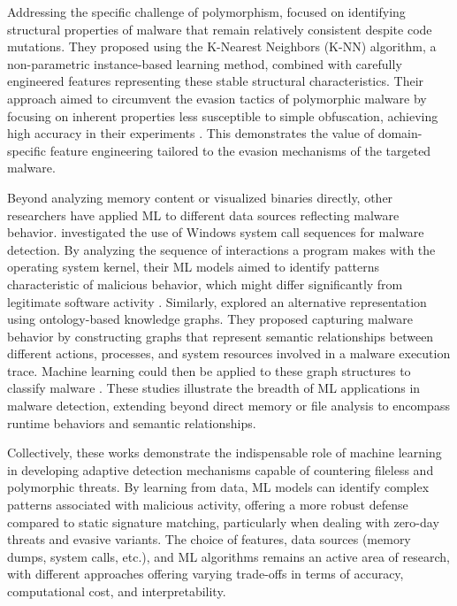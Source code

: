Addressing the specific challenge of polymorphism, \citet{khoje2024revolutionary} focused on identifying structural properties of malware that remain relatively consistent despite code mutations. They proposed using the K-Nearest Neighbors (K-NN) algorithm, a non-parametric instance-based learning method, combined with carefully engineered features representing these stable structural characteristics. Their approach aimed to circumvent the evasion tactics of polymorphic malware by focusing on inherent properties less susceptible to simple obfuscation, achieving high accuracy in their experiments \citep{khoje2024revolutionary}. This demonstrates the value of domain-specific feature engineering tailored to the evasion mechanisms of the targeted malware.

Beyond analyzing memory content or visualized binaries directly, other researchers have applied ML to different data sources reflecting malware behavior. \citet{hammi2024malware} investigated the use of Windows system call sequences for malware detection. By analyzing the sequence of interactions a program makes with the operating system kernel, their ML models aimed to identify patterns characteristic of malicious behavior, which might differ significantly from legitimate software activity \citep{hammi2024malware}. Similarly, \citet{chowdhury2022capturing} explored an alternative representation using ontology-based knowledge graphs. They proposed capturing malware behavior by constructing graphs that represent semantic relationships between different actions, processes, and system resources involved in a malware execution trace. Machine learning could then be applied to these graph structures to classify malware \citep{chowdhury2022capturing}. These studies illustrate the breadth of ML applications in malware detection, extending beyond direct memory or file analysis to encompass runtime behaviors and semantic relationships.

Collectively, these works demonstrate the indispensable role of machine learning in developing adaptive detection mechanisms capable of countering fileless and polymorphic threats. By learning from data, ML models can identify complex patterns associated with malicious activity, offering a more robust defense compared to static signature matching, particularly when dealing with zero-day threats and evasive variants. The choice of features, data sources (memory dumps, system calls, etc.), and ML algorithms remains an active area of research, with different approaches offering varying trade-offs in terms of accuracy, computational cost, and interpretability.


